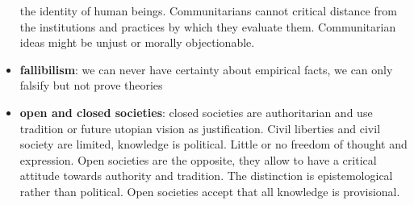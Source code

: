 \begin{itemize}
	 the identity of human beings. Communitarians cannot critical distance
	 from the institutions and practices by which they evaluate them.
	 Communitarian ideas might be unjust or morally objectionable.
	\item \textbf{fallibilism}: we can never have certainty about empirical
	 facts, we can only falsify but not prove theories
	\item \textbf{open and closed societies}: closed societies are
	 authoritarian and use tradition or future utopian vision as
	 justification. Civil liberties and civil society are limited,
	 knowledge is political. Little or no freedom of thought and
	 expression. Open societies are the opposite, they allow to have a
	 critical attitude towards authority and tradition. The distinction is
	 epistemological rather than political. Open societies accept that all
	 knowledge is provisional.
\end{itemize}
